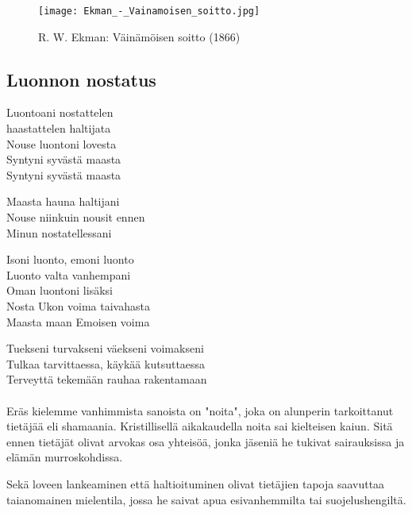 
\vfill%
\begin{figure}[!ht]%
  \centering%
  \texttt{[image: Ekman\_-\_Vainamoisen\_soitto.jpg]}%
  \caption{R. W. Ekman: Väinämöisen soitto (1866)}%
\end{figure}
\vfill%

\clearpage
\subsection{Luonnon nostatus}
  \begin{large}
    \begin{center}
      Luontoani nostattelen\\
      haastattelen haltijata\\
      Nouse luontoni lovesta\\
      Syntyni syvästä maasta\\
      Syntyni syvästä maasta\\
    \end{center}
    \begin{center}
      Maasta hauna haltijani\\
      Nouse niinkuin nousit ennen\\
      Minun nostatellessani\\
    \end{center}
    \begin{center}
      Isoni luonto, emoni luonto\\
      Luonto valta vanhempani\\
      Oman luontoni lisäksi\\
      Nosta Ukon voima taivahasta\\
      Maasta maan Emoisen voima\\
    \end{center}
    \begin{center}
      Tuekseni turvakseni väekseni voimakseni\\
      Tulkaa tarvittaessa, käykää kutsuttaessa\\
      Terveyttä tekemään rauhaa rakentamaan\\
    \end{center}
  \end{large}

  \paragraph{}
  \begin{em}
    Eräs kielemme vanhimmista sanoista on "noita", joka on alunperin tarkoittanut tietäjää eli 
    shamaania. Kristillisellä aikakaudella noita sai kielteisen kaiun. Sitä ennen tietäjät 
    olivat arvokas osa yhteisöä, jonka jäseniä he tukivat sairauksissa ja elämän murroskohdissa.
    \par
    Sekä loveen lankeaminen että haltioituminen olivat tietäjien tapoja saavuttaa taianomainen 
    mielentila, jossa he saivat apua esivanhemmilta tai suojelushengiltä.
  \end{em}
 
